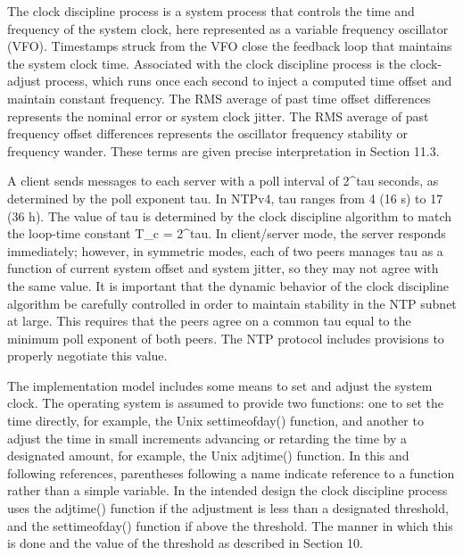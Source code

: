 The clock discipline process is a system process that controls the
time and frequency of the system clock, here represented as a
variable frequency oscillator (VFO). Timestamps struck from the VFO
close the feedback loop that maintains the system clock time.
Associated with the clock discipline process is the clock-adjust
process, which runs once each second to inject a computed time offset
and maintain constant frequency. The RMS average of past time offset
differences represents the nominal error or system clock jitter. The
RMS average of past frequency offset differences represents the
oscillator frequency stability or frequency wander. These terms are
given precise interpretation in Section 11.3.

A client sends messages to each server with a poll interval of 2^tau
seconds, as determined by the poll exponent tau. In NTPv4, tau
ranges from 4 (16 s) to 17 (36 h). The value of tau is determined by
the clock discipline algorithm to match the loop-time constant T_c =
2^tau. In client/server mode, the server responds immediately;
however, in symmetric modes, each of two peers manages tau as a
function of current system offset and system jitter, so they may not
agree with the same value. It is important that the dynamic behavior
of the clock discipline algorithm be carefully controlled in order to
maintain stability in the NTP subnet at large. This requires that
the peers agree on a common tau equal to the minimum poll exponent of
both peers. The NTP protocol includes provisions to properly
negotiate this value.

The implementation model includes some means to set and adjust the
system clock. The operating system is assumed to provide two
functions: one to set the time directly, for example, the Unix
settimeofday() function, and another to adjust the time in small
increments advancing or retarding the time by a designated amount,
for example, the Unix adjtime() function. In this and following
references, parentheses following a name indicate reference to a
function rather than a simple variable. In the intended design the
clock discipline process uses the adjtime() function if the
adjustment is less than a designated threshold, and the
settimeofday() function if above the threshold. The manner in which
this is done and the value of the threshold as described in
Section 10.
